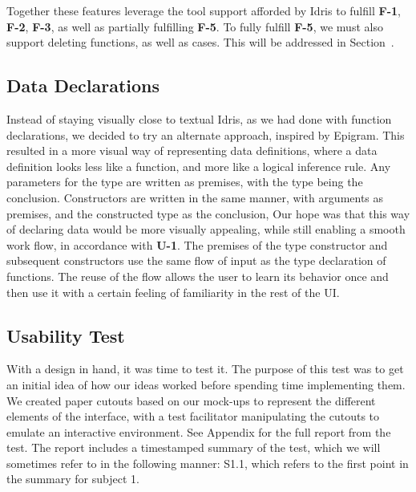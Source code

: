 Together these features leverage the tool support afforded by Idris to fulfill \textbf{F-1}, \textbf{F-2}, \textbf{F-3}, as well as partially fulfilling \textbf{F-5}. To fully fulfill \textbf{F-5}, we must also support deleting functions, as well as cases. This will be addressed in Section~.


\subsection{Data Declarations}
Instead of staying visually close to textual Idris, as we had done with function declarations, we decided to try an alternate approach, inspired by Epigram.
This resulted in a more visual way of representing data definitions, where a data definition looks less like a function, and more like a logical inference rule.
Any parameters for the type are written as premises, with the type being the conclusion.
Constructors are written in the same manner, with arguments as premises, and the constructed type as the conclusion,
Our hope was that this way of declaring data would be more visually appealing, while still enabling a smooth work flow, in accordance with \textbf{U-1}.
The premises of the type constructor and subsequent constructors use the same flow of input as the type declaration of functions.
The reuse of the flow allows the user to learn its behavior once and then use it with a certain feeling of familiarity in the rest of the UI\@.

\subsection{Usability Test}
\label{sec:UsabilityTest}
With a design in hand, it was time to test it. The purpose of this test was to
get an initial idea of how our ideas worked before spending time implementing
them. We created paper cutouts based on our mock-ups to represent the different
elements of the interface, with a test facilitator manipulating the cutouts to
emulate an interactive environment. See Appendix  for the full report
from the test. The report includes a timestamped summary of the test, which we
will sometimes refer to in the following manner: S1.1, which refers to the
first point in the summary for subject 1.

